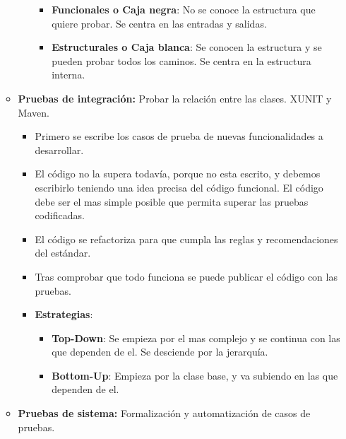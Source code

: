 \documentclass[12pt, twoside, openright]{report} %
\begin{document}
\begin{itemize}
\begin{itemize}
\begin{itemize}
      \begin{itemize}
      \item \textbf{Funcionales o Caja negra}: No se conoce la estructura
        que quiere probar. Se centra en las entradas y salidas.
        
      \item \textbf{Estructurales o Caja blanca}: Se conocen la estructura y
        se pueden probar todos los caminos. Se centra en la estructura
        interna.
        
      \end{itemize}
    \end{itemize}
  \item \textbf{Pruebas de integración:} Probar la relación entre las
    clases. XUNIT y Maven.
    

    \begin{itemize}
    \item Primero se escribe los casos de prueba de nuevas funcionalidades a
      desarrollar.
      
    \item El código no la supera todavía, porque no esta escrito, y debemos
      escribirlo teniendo una idea precisa del código funcional. El
      código debe ser el mas simple posible que permita superar las
      pruebas codificadas.
      
    \item El código se refactoriza para que cumpla las reglas y
      recomendaciones del estándar.
      
    \item Tras comprobar que todo funciona se puede publicar el código con
      las pruebas.
      
    \item \textbf{Estrategias}:
      

      \begin{itemize}
      \item \textbf{Top-Down}: Se empieza por el mas complejo y se continua
        con las que dependen de el. Se desciende por la jerarquía.
        
      \item \textbf{Bottom-Up}: Empieza por la clase base, y va subiendo en
        las que dependen de el.
        
      \end{itemize}
    \end{itemize}
  \item \textbf{Pruebas de sistema:} Formalización y automatización de casos
    de pruebas.
    

\end{itemize}
\end{itemize}
\end{document}
